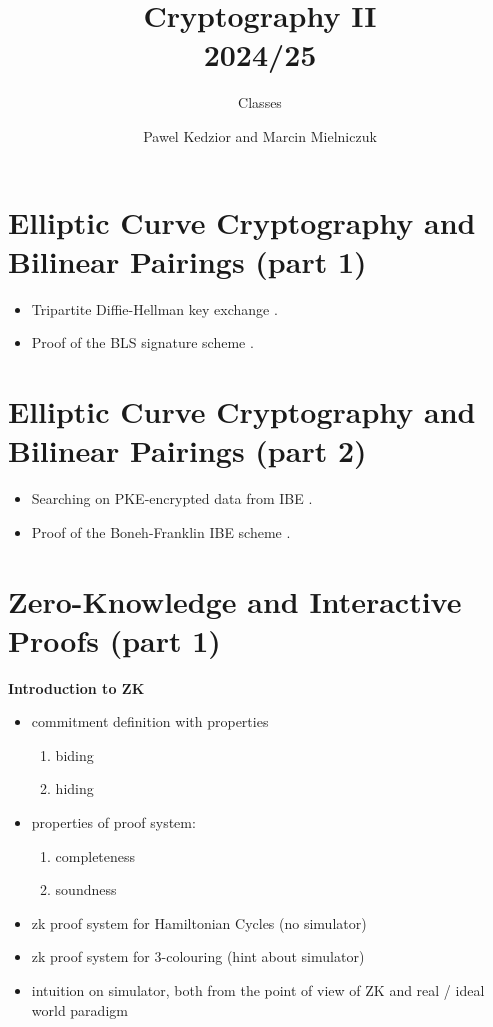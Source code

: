 \documentclass{llncs}
\title{Cryptography II\\ 2024/25}
\subtitle{Classes}
\author{Pawel Kedzior and Marcin Mielniczuk}
\institute{University of Warsaw}
\begin{document}
\maketitle

\section{Elliptic Curve Cryptography and Bilinear Pairings (part 1)}


\begin{itemize}
    \item Tripartite Diffie-Hellman key exchange \cite[Section 3.2]{tdh}.
    \item Proof of the BLS signature scheme \cite[Theorem 15.1]{Boneh2023}.
\end{itemize}


\section{Elliptic Curve Cryptography and Bilinear Pairings (part 2)}


\begin{itemize}
    \item Searching on PKE-encrypted data from IBE \cite[Section 15.6.4.3]{Boneh2023}.
    \item Proof of the Boneh-Franklin IBE scheme \cite[Theorem 15.6]{Boneh2023}.
\end{itemize}


\section{Zero-Knowledge and Interactive Proofs (part 1)}
\textbf{Introduction to ZK}
\begin{itemize}
	\item commitment definition with properties
		\begin{enumerate}
			\item biding
			\item hiding
		\end{enumerate}
	\item properties of proof system:
		\begin{enumerate}
			\item completeness
			\item soundness
		\end{enumerate}
	\item zk proof system for Hamiltonian Cycles (no simulator)
	\item zk proof system for  3-colouring (hint about simulator)
	\item intuition on simulator, both from the point of view of ZK and real / ideal world paradigm
\end{itemize}
\end{document}
